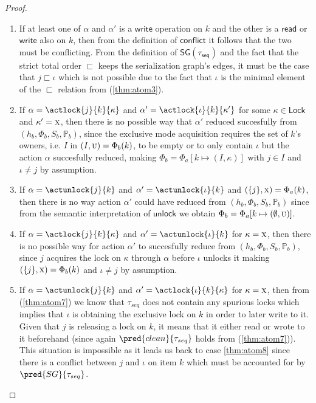 {\begin{proof}
\begin{enumerate}[label=({\roman*})]
	\item \label{thm:atom8} If at least one of $\alpha$ and $\alpha'$ is a $\mathsf{write}$ operation on $k$ and the other is a $\mathsf{read}$ or $\mathsf{write}$ also on $k$, then from the definition of $\mathsf{conflict}$ it follows that the two must be conflicting. From the definition of $\mathsf{SG(\tau_{seq})}$ and the fact that the strict total order $\sqsubset$ keeps the serialization graph's edges, it must be the case that $j \sqsubset \iota$ which is not possible due to the fact that $\iota$ is the minimal element of the $\sqsubset$ relation from (\ref{thm:atom3}).
	
	\item If $\alpha = \actlock{j}{k}{\kappa}$ and $\alpha' = \actlock{\iota}{k}{\kappa'}$ for some $\kappa \in \mathsf{Lock}$ and $\kappa' = \textsc{x}$, then there is no possible way that $\alpha'$ reduced succesfully from $(h_b, \Phi_b, S_b, \mathds{P}_b)$, since the exclusive mode acquisition requires the set of $k$'s owners, i.e. $I$ in $(I, \textsc{u}) = \Phi_b(k)$, to be empty or to only contain $\iota$ but the action $\alpha$ succesfully reduced, making $\Phi_b = \Phi_a[k \mapsto (I, \kappa)]$ with $j \in I$ and $\iota \neq j$ by assumption.
	
	\item If $\alpha = \actunlock{j}{k}$ and $\alpha' = \actunlock{\iota}{k}$ and $(\{j\}, \textsc{x}) = \Phi_a(k)$, then there is no way action $\alpha'$ could have reduced from $(h_b, \Phi_b, S_b, \mathds{P}_b)$ since from the semantic interpretation of $\mathsf{unlock}$ we obtain $\Phi_b = \Phi_a[k \mapsto (\emptyset, \textsc{u})]$.
	
	\item If $\alpha = \actlock{j}{k}{\kappa}$ and $\alpha' = \actunlock{\iota}{k}$ for $\kappa = \textsc{x}$, then there is no possible way for action $\alpha'$ to succesfully reduce from $(h_b, \Phi_b, S_b, \mathds{P}_b)$, since $j$ acquires the lock on $\kappa$ through $\alpha$ before $\iota$ unlocks it making $(\{j\}, \textsc{x}) = \Phi_b(k)$ and $\iota \neq j$ by assumption.
	
	\item If $\alpha = \actunlock{j}{k}$ and $\alpha' = \actlock{\iota}{k}{\kappa}$ for $\kappa = \textsc{x}$, then from (\ref{thm:atom7}) we know that $\tau_{seq}$ does not contain any spurious locks which implies that $\iota$ is obtaining the exclusive lock on $k$ in order to later write to it. Given that $j$ is releasing a lock on $k$, it means that it either read or wrote to it beforehand (since again $\pred{clean}{\tau_{seq}}$ holds from (\ref{thm:atom7})). This situation is impossible as it leads us back to case \ref{thm:atom8} since there is a conflict between $j$ and $\iota$ on item $k$ which must be accounted for by $\pred{SG}{\tau_{seq}}$.
	

\end{enumerate}
\end{proof}}
